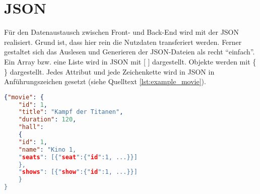 \section{\acf{JSON}}
\label{sec:json}
\authorsection{\authorSG}

Für den Datenaustausch zwischen Front- und Back-End wird mit der \acf{JSON} realisiert.
Grund ist, dass hier rein die Nutzdaten transferiert werden.
Ferner gestaltet sich das Auslesen und Generieren der \acs{JSON}-Dateien als recht \enquote{einfach}. \\
Ein Array bzw. eine Liste wird in \acs{JSON} mit [ ] dargestellt.
Objekte werden mit \{ \} dargestellt.
Jedes Attribut und jede Zeichenkette wird in \acs{JSON} in Anführungszeichen gesetzt (siehe Quelltext \vref{lst:example_movie}).

\begin{lstlisting}[language=json,firstnumber=1]
{"movie": {
	"id": 1,
	"title": "Kampf der Titanen",
	"duration": 120,
	"hall":
	{
	"id": 1,
	"name": "Kino 1,
	"seats": [{"seat":{"id":1, ...}}]
	}, 
	"shows": [{"show":{"id":1, ...}}]
	}
}
\end{lstlisting}
\label{lst:example_movie}